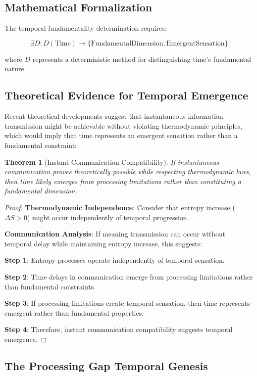 \documentclass[12pt,a4paper]{article}
\newtheorem{theorem}{Theorem}[section]
\begin{document}
\subsection{Mathematical Formalization}

The temporal fundamentality determination requires:

$$\exists D: D(\text{Time}) \to \{\text{FundamentalDimension}, \text{EmergentSensation}\}$$

where $D$ represents a deterministic method for distinguishing time's fundamental nature.

\subsection{Theoretical Evidence for Temporal Emergence}

Recent theoretical developments suggest that instantaneous information transmission might be achievable without violating thermodynamic principles, which would imply that time represents an emergent sensation rather than a fundamental constraint:

\begin{theorem}[Instant Communication Compatibility]
If instantaneous communication proves theoretically possible while respecting thermodynamic laws, then time likely emerges from processing limitations rather than constituting a fundamental dimension.
\end{theorem}

\begin{proof}
\textbf{Thermodynamic Independence}: Consider that entropy increase ($\Delta S > 0$) might occur independently of temporal progression.

\textbf{Communication Analysis}: If meaning transmission can occur without temporal delay while maintaining entropy increase, this suggests:

\textbf{Step 1}: Entropy processes operate independently of temporal sensation.

\textbf{Step 2}: Time delays in communication emerge from processing limitations rather than fundamental constraints.

\textbf{Step 3}: If processing limitations create temporal sensation, then time represents emergent rather than fundamental properties.

\textbf{Step 4}: Therefore, instant communication compatibility suggests temporal emergence.
\end{proof}

\subsection{The Processing Gap Temporal Genesis}
\end{document}
